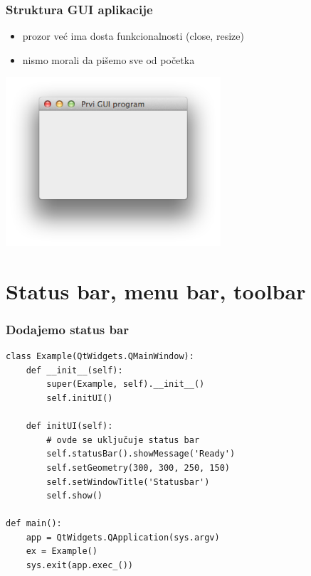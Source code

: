 \documentclass[utf8,compress,aspectratio=169]{beamer}
\begin{document}
\begin{frame}[fragile]
  \frametitle{Struktura GUI aplikacije}
  \begin{itemize}
    \item prozor već ima dosta funkcionalnosti (close, resize)
    \item nismo morali da pišemo sve od početka
  \end{itemize}
  \begin{center}
    \includegraphics[width=8cm]{pyqt01.png}
  \end{center}
\end{frame}

\section[Bars]{Status bar, menu bar, toolbar}

\begin{frame}[fragile]
  \frametitle{Dodajemo status bar}
\begin{verbatim}
class Example(QtWidgets.QMainWindow):
    def __init__(self):
        super(Example, self).__init__()
        self.initUI()

    def initUI(self):
        # ovde se uključuje status bar
        self.statusBar().showMessage('Ready')
        self.setGeometry(300, 300, 250, 150)
        self.setWindowTitle('Statusbar')
        self.show()

def main():
    app = QtWidgets.QApplication(sys.argv)
    ex = Example()
    sys.exit(app.exec_())
\end{verbatim}
\end{frame}
\end{document}
